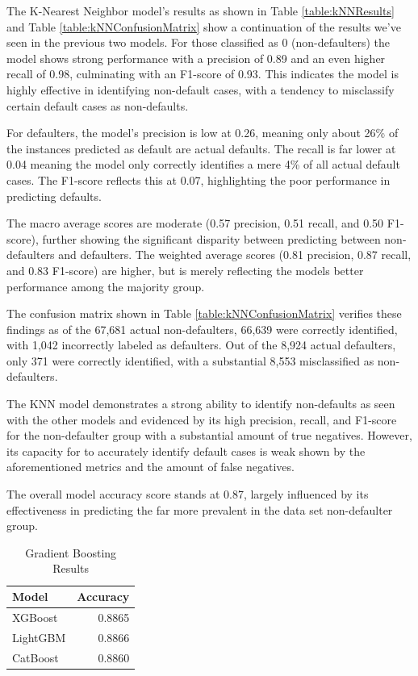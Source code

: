 \documentclass[12pt]{article}
\begin{document}
The K-Nearest Neighbor model's results as shown in Table \ref{table:kNNResults} and Table \ref{table:kNNConfusionMatrix} show a continuation of the results we've seen in the previous two models. For those classified as 0 (non-defaulters) the model shows strong performance with a precision of 0.89 and an even higher recall of 0.98, culminating with an F1-score of 0.93. This indicates the model is highly effective in identifying non-default cases, with a tendency to misclassify certain default cases as non-defaults.

For defaulters, the model's precision is low at 0.26, meaning only about 26\% of the instances predicted as default are actual defaults. The recall is far lower at 0.04 meaning the model only correctly identifies a mere 4\% of all actual default cases. The F1-score reflects this at 0.07, highlighting the poor performance in predicting defaults.

The macro average scores are moderate (0.57 precision, 0.51 recall, and 0.50 F1-score), further showing the significant disparity between predicting between non-defaulters and defaulters. The weighted average scores (0.81 precision, 0.87 recall, and 0.83 F1-score) are higher, but is merely reflecting the models better performance among the majority group.

The confusion matrix shown in Table \ref{table:kNNConfusionMatrix} verifies these findings as of the 67,681 actual non-defaulters, 66,639 were correctly identified, with 1,042 incorrectly labeled as defaulters. Out of the 8,924 actual defaulters, only 371 were correctly identified, with a substantial 8,553 misclassified as non-defaulters. 

The KNN model demonstrates a strong ability to identify non-defaults as seen with the other models and evidenced by its high precision, recall, and F1-score for the non-defaulter group with a substantial amount of true negatives. However, its capacity for to accurately identify default cases is weak shown by the aforementioned metrics and the amount of false negatives.

The overall model accuracy score stands at 0.87, largely influenced by its effectiveness in predicting the far more prevalent in the data set non-defaulter group. 

\begin{table}[htbp]
    \centering
    \caption{Gradient Boosting Results}
    \begin{tabular}{lr}
        \toprule
        Model & Accuracy \\
        \midrule
        XGBoost & 0.8865 \\
        LightGBM & 0.8866 \\
        CatBoost & 0.8860 \\
        \bottomrule
    \end{tabular}
    \label{table:gradientBoostingResults}
\end{table}
\end{document}
